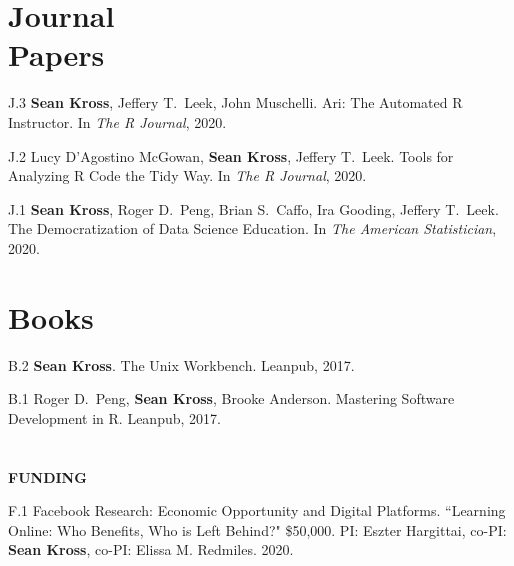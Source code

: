 
\section{Journal \\ Papers}

\begin{bibenum}

\item[J.3] \textbf{Sean Kross}, Jeffery T.\ Leek, John Muschelli.
Ari: The Automated R Instructor. 
In \emph{The R Journal}, 2020.

\item[J.2] Lucy D'Agostino McGowan, \textbf{Sean Kross}, Jeffery T.\ Leek.
Tools for Analyzing R Code the Tidy Way. 
In \emph{The R Journal}, 2020.

\item[J.1] \textbf{Sean Kross}, Roger D.\ Peng, Brian S.\ Caffo, Ira Gooding,
Jeffery T.\ Leek. The Democratization of Data Science Education. 
In \emph{The American Statistician}, 2020.

\end{bibenum}

\vspace{0.1in}

\section{Books}

\begin{bibenum}

\item[B.2] \textbf{Sean Kross}. The Unix Workbench. Leanpub, 2017.

\item[B.1] Roger D.\ Peng, \textbf{Sean Kross}, Brooke Anderson. Mastering 
Software Development in R. Leanpub, 2017.

\end{bibenum}


\section{} \vspace{0.2in} \textbf{FUNDING} \vspace{0.05in}

\begin{bibenum}

\item[F.1] Facebook Research: Economic Opportunity and Digital Platforms. ``Learning Online: Who Benefits, Who is Left Behind?" \$50,000. PI: Eszter Hargittai, co-PI: \textbf{Sean Kross}, co-PI: Elissa M. Redmiles. 2020.

\end{bibenum}

